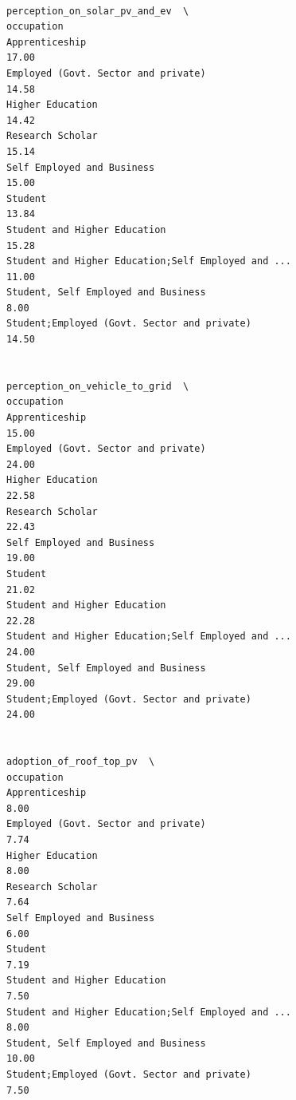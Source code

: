 \documentclass[
  letterpaper,
  DIV=11,
  numbers=noendperiod]{scrartcl}
\begin{document}
\begin{verbatim}
                                                    perception_on_solar_pv_and_ev  \
occupation                                                                          
Apprenticeship                                                              17.00   
Employed (Govt. Sector and private)                                         14.58   
Higher Education                                                            14.42   
Research Scholar                                                            15.14   
Self Employed and Business                                                  15.00   
Student                                                                     13.84   
Student and Higher Education                                                15.28   
Student and Higher Education;Self Employed and ...                          11.00   
Student, Self Employed and Business                                          8.00   
Student;Employed (Govt. Sector and private)                                 14.50   

                                                    perception_on_vehicle_to_grid  \
occupation                                                                          
Apprenticeship                                                              15.00   
Employed (Govt. Sector and private)                                         24.00   
Higher Education                                                            22.58   
Research Scholar                                                            22.43   
Self Employed and Business                                                  19.00   
Student                                                                     21.02   
Student and Higher Education                                                22.28   
Student and Higher Education;Self Employed and ...                          24.00   
Student, Self Employed and Business                                         29.00   
Student;Employed (Govt. Sector and private)                                 24.00   

                                                    adoption_of_roof_top_pv  \
occupation                                                                    
Apprenticeship                                                         8.00   
Employed (Govt. Sector and private)                                    7.74   
Higher Education                                                       8.00   
Research Scholar                                                       7.64   
Self Employed and Business                                             6.00   
Student                                                                7.19   
Student and Higher Education                                           7.50   
Student and Higher Education;Self Employed and ...                     8.00   
Student, Self Employed and Business                                   10.00   
Student;Employed (Govt. Sector and private)                            7.50   


\end{verbatim}
\end{document}
